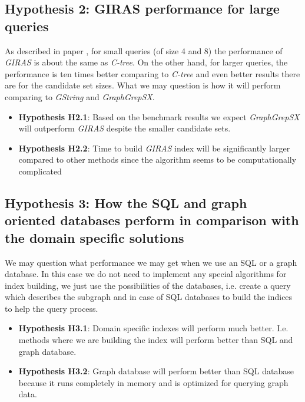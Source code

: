 \subsection{Hypothesis 2: GIRAS performance for large queries}

As described in paper \cite{GIRAS}, for small queries (of size 4 and 8) the performance of \textit{GIRAS} is about the same as \textit{C-tree}. On the other hand, for larger queries, the performance is ten times better comparing to \textit{C-tree} and even better results there are for the candidate set sizes. What we may question is how it will perform comparing to \textit{GString} and \textit{GraphGrepSX}.

\begin{itemize}
	\item \textbf{Hypothesis H2.1}: Based on the benchmark results we expect \textit{GraphGrepSX} will outperform \textit{GIRAS} despite the smaller candidate sets.
	\item \textbf{Hypothesis H2.2}: Time to build \textit{GIRAS} index will be significantly larger compared to other methods since the algorithm seems to be computationally complicated
\end{itemize}


\subsection{Hypothesis 3: How the SQL and graph oriented databases perform in comparison with the domain specific solutions}

We may question what performance we may get when we use an SQL or a graph database. In this case we do not need to implement any special algorithms for index building, we just use the possibilities of the databases, i.e. create a query which describes the subgraph and in case of SQL databases to build the indices to help the query process.\\

\begin{itemize}
	\item \textbf{Hypothesis H3.1}: Domain specific indexes will perform much better. I.e. methods where we are building the index will perform better than SQL and graph database.
	\item \textbf{Hypothesis H3.2}: Graph database will perform better than SQL database because it runs completely in memory and is optimized for querying graph data. 
\end{itemize}



